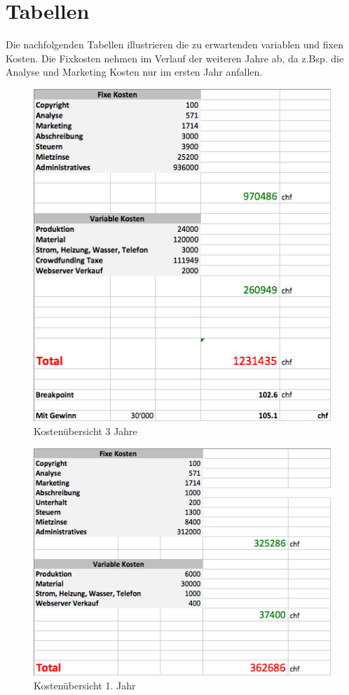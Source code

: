 \section{Tabellen}
Die nachfolgenden Tabellen illustrieren die zu erwartenden variablen und fixen Kosten. Die Fixkosten nehmen im Verlauf der weiteren Jahre ab, da z.Bsp. die Analyse und Marketing Kosten nur im ersten Jahr anfallen.
\begin{figure}[H]
	\centering
		\includegraphics[scale=0.7]{bilder/3Jahre.png}
	\caption{Kosten\"ubersicht 3 Jahre}
	\label{fig:3Jahre}
\end{figure}
\begin{figure}[H]
	\centering
		\includegraphics[scale=0.7]{bilder/Jahr1.png}
	\caption{Kosten\"ubersicht 1. Jahr}
	\label{fig:Jahr1}
\end{figure}
